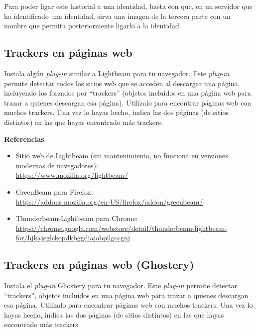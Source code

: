 Para poder ligar este historial a una identidad, basta con que, en un servidor que ha identificado una identidad, sirva una imagen de la tercera parte con un nombre que permita posteriormente ligarlo a la identidad.

\subsection{Trackers en páginas web}
\label{subsec:trackers-paginas-web}

Instala algún \emph{plug-in} similar a Lightbeam para tu navegador. Este \emph{plug-in} permite detectar todos los sitios web que se acceden al descargar una página, incluyendo los forzados por ``trackers'' (objetos incluidos en una página web para trazar a quienes descargan esa página). Utilízalo para encontrar páginas web con muchos trackers. Una vez lo hayas hecho, indica las dos páginas (de sitios distintos) en las que hayas encontrado más trackers.

\textbf{Referencias}

\begin{itemize}
\item Sitio web de Lightbeam (sin mantenimiento, no funciona en versiones modernas de navegadores): \\
  \url{https://www.mozilla.org/lightbeam/}
\item GreenBeam para Firefox: \\
  \url{https://addons.mozilla.org/en-US/firefox/addon/greenbeam/}
\item Thunderbeam-Lightbeam para Chrome: \\
  \url{https://chrome.google.com/webstore/detail/thunderbeam-lightbeam-for/hjkajeglckopdkbggdiajobpilgccgnj}
\end{itemize}

\subsection{Trackers en páginas web (Ghostery)}
\label{subsec:trackers-paginas-web-2}

Instala el \emph{plug-in} Ghostery para tu navegador. Este \emph{plug-in} permite detectar ``trackers'', objetos incluidos en una página web para trazar a quienes descargan esa página. Utilízalo para encontrar páginas web con muchos trackers. Una vez lo hayas hecho, indica las dos páginas (de sitios distintos) en las que hayas encontrado más trackers.

